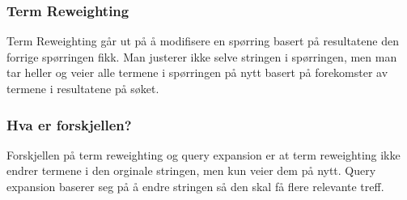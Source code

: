 \subsubsection*{Term Reweighting}
Term Reweighting går ut på å modifisere en spørring basert på resultatene den forrige spørringen fikk. Man justerer ikke selve stringen i spørringen, men man tar heller og veier alle termene i spørringen på nytt basert på forekomster av termene i resultatene på søket.
\subsubsection*{Hva er forskjellen?}
Forskjellen på term reweighting og query expansion er at term reweighting ikke endrer termene i den orginale stringen, men kun veier dem på nytt. Query expansion baserer seg på å endre stringen så den skal få flere relevante treff.


\pagebreak

